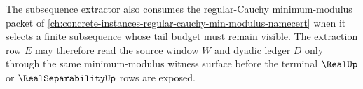 The subsequence extractor also consumes the regular-Cauchy minimum-modulus packet of \autoref{ch:concrete-instances-regular-cauchy-min-modulus-namecert} when it selects a finite subsequence whose tail budget must remain visible. The extraction row $E$ may therefore read the source window $W$ and dyadic ledger $D$ only through the same minimum-modulus witness surface before the terminal $\RealUp$ or $\RealSeparabilityUp$ rows are exposed.
